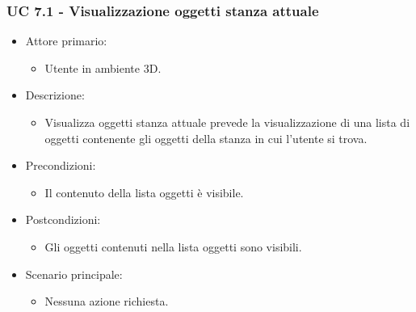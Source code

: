 \subsubsection{UC 7.1 - Visualizzazione oggetti stanza attuale}
\begin{itemize}

	\item Attore primario: 
	\begin{itemize}
		\item Utente in ambiente 3D.
	\end{itemize}
	\item Descrizione:
	\begin{itemize}
		\item Visualizza oggetti stanza attuale prevede la visualizzazione di una lista di oggetti contenente gli oggetti della stanza in
cui l'utente si trova.
	\end{itemize}
	
	\item Precondizioni:
	\begin{itemize}
		\item Il contenuto della lista oggetti è visibile.
	\end{itemize}
	
	\item Postcondizioni:
	\begin{itemize}
		\item Gli oggetti contenuti nella lista oggetti sono visibili.
	\end{itemize}
	
	\item Scenario principale:
	\begin{itemize}
		\item Nessuna azione richiesta.
	\end{itemize}
	
\end{itemize}

\pagebreak

